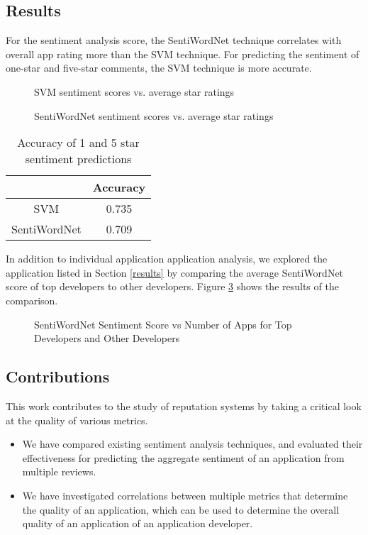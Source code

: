 \documentclass{acm_proc_article-sp}
\begin{document}
\subsection{Results}
For the sentiment analysis score, the SentiWordNet technique correlates with overall app rating more than the SVM technique.  For predicting the sentiment of one-star and five-star comments, the SVM technique is more accurate.

\begin{figure}[!h]
\centering
{}
\caption{SVM sentiment scores vs. average star ratings}
\label{fig:myfig1}
\end{figure}

\begin{figure}[!h]
\centering
{}
\caption{SentiWordNet sentiment scores vs. average star ratings}
\label{fig:myfig2}
\end{figure}

\begin{table}[!h]
\centering
\caption{Accuracy of 1 and 5 star sentiment predictions}
\begin{tabular}{|c|c|}
\hline
& \textbf{Accuracy} \\ \hline
SVM & 0.735 \\ \hline
SentiWordNet & 0.709 \\ \hline
\end{tabular}
\end{table}

In addition to individual application application analysis, we explored the application listed in Section \ref{results} by comparing the average SentiWordNet score
of top developers to other developers. Figure \ref{fig:myfig3} shows the results of the comparison.
\begin{figure}[!h]
\centering
{}
\caption{SentiWordNet Sentiment Score vs Number of Apps for Top Developers and Other Developers}
\label{fig:myfig3}
\end{figure}

\subsection{Contributions}
This work contributes to the study of reputation systems by taking a critical look at the quality of various metrics.
\begin{itemize}
\item{We have compared existing sentiment analysis techniques, and evaluated their effectiveness for predicting the aggregate sentiment of an application from multiple reviews.}
\item{We have investigated correlations between multiple metrics that determine the quality of an application, which can be used to determine the overall quality of an application of an application developer.}
\end{itemize}
\end{document}
